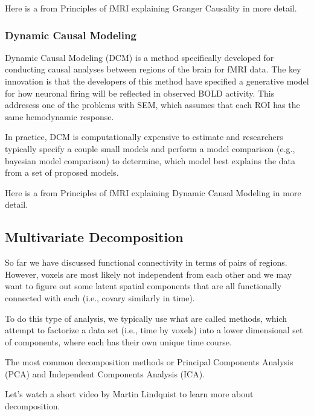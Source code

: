\documentclass[letterpaper,10pt,english]{sphinxmanual}
\begin{document}
Here is a  from Principles of fMRI explaining Granger Causality in more detail.


\subsubsection{Dynamic Causal Modeling}
\label{\detokenize{content/Connectivity:dynamic-causal-modeling}}
Dynamic Causal Modeling (DCM) is a method specifically developed for conducting causal analyses between regions of the brain for fMRI data. The key innovation is that the developers of this method have specified a generative model for how neuronal firing will be reflected in observed BOLD activity. This addresess one of the problems with SEM, which assumes that each ROI has the same hemodynamic response.

In practice, DCM is computationally expensive to estimate and researchers typically specify a couple small models and perform a model comparison (e.g., bayesian model comparison) to determine, which model best explains the data from a set of proposed models.

Here is a  from Principles of fMRI explaining Dynamic Causal Modeling in more detail.


\subsection{Multivariate Decomposition}
\label{\detokenize{content/Connectivity:multivariate-decomposition}}
So far we have discussed functional connectivity in terms of pairs of regions. However, voxels are most likely not independent from each other and we may want to figure out some latent spatial components that are all functionally connected with each (i.e., covary similarly in time).

To do this type of analysis, we typically use what are called  methods, which attempt to factorize a data set (i.e., time by voxels) into a lower dimensional set of components, where each has their own unique time course.

The most common decomposition methods or Principal Components Analysis (PCA) and Independent Components Analysis (ICA).

Let’s watch a short video by Martin Lindquist to learn more about decomposition.

\begin{sphinxVerbatim}[commandchars=\\\{\}]
   

\end{sphinxVerbatim}
\end{document}
